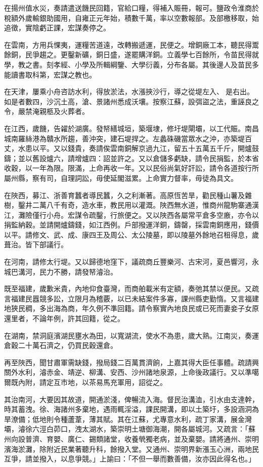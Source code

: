 \begin{pinyinscope}
在揚州值水災，奏請遣送饑民回籍，官給口糧，得補入賑冊，報可。鹽政令淮商於稅額外歲輸銀助國用，自雍正元年始，積數千萬，率以空數報部。及部檄移取，始追徵，實陰虧正課，宏謀奏停之。

在雲南，方用兵惈夷，運糧苦道遠，改轉搬遞運，民便之。增銅廠工本，聽民得鬻餘銅，民爭趨之。更鑿新礦，銅日盛，遂罷購洋銅。立義學七百餘所，令苗民得就學，教之書。刻孝經、小學及所輯綱鑒、大學衍義，分布各屬。其後邊人及苗民多能讀書取科第，宏謀之教也。

在天津，屢乘小舟咨訪水利，得放淤法，水漲挾沙行，導之從堤左入、是右出。如是者數四，沙沉土高，滄、景諸州悉成沃壤。按察江蘇，設弭盜之法，重誣良之令，嚴禁淹親柩及火葬者。

在江西，歲饑，告糴於湖廣。發帑繕城垣，築堰埭，修圩堤閘壩，以工代賑。南昌城南羅絲港為贛水所趨，善沖突，建石堤捍之。左蠡硃磯當眾水之沖，亦築堤百丈，水患以平。又以錢貴，奏請俟雲南銅解京過九江，留五十五萬五千斤，開爐鼓鑄；並以舊設爐六，請增爐四：詔並許之。又以倉儲多虧缺，請令民捐監，於本省收穀，以一年為限。限滿，上命再收一年。又以民俗尚氣好訐訟，請令各道按行所屬州縣，察有司，自理詞訟，毋使延閣滋累。上命實力督率，毋徒為具文。

在陜西，募江、浙善育蠶者導民蠶，久之利漸著。高原恆苦旱，勸民種山薯及雜樹，鑿井二萬八千有奇，造水車，教民用以灌溉。陜西無水道，惟商州龍駒寨通漢江，灘險僅行小舟。宏謀令疏鑿，行旅便之。又以陜西各屬常平倉多空廒，亦令以捐監納穀。並請開爐鑄錢，如江西例。戶部撥運洋銅，鑄罄，採雲南銅應用，錢價以平。請修文、武、成、康四王及周公、太公陵墓，即以陵墓外餘地召租得息，歲葺治。皆下部議行。

在河南，請修太行堤。又以歸德地窪下，議疏商丘豐樂河、古宋河，夏邑響河，永城巴溝河，民力不勝，請發帑濬治。

既至福建，歲歉米貴，內地仰食臺灣，而商舶載米有定額，奏弛其禁以便民。又疏言福建民囂競多訟，立限月為稽覈，以已未結案件多寡，課州縣吏勤惰。又言福建地狹民稠，多出海為商，年久例不準回籍。請令察實內地良民或已死而妻妾子女原還里者，不論年例，許其回籍，從之。

在湖南，禁洞庭濱湖民壅水為田，以寬湖流，使水不為患，歲大熟。江南災，奏運倉穀二十萬石濟之，仍買民穀還倉。

再至陜西，聞甘肅軍需缺錢，撥局錢二百萬貫濟餉，上嘉其得大臣任事體。疏請興關外水利，濬赤金、靖逆、柳溝、安西、沙州諸地泉源，上命後政議行。又以準噶爾既內附，請定互巿地，以茶易馬充軍用，詔從之。

其治南河，大要因其故道，開通淤淺，俾暢流入海。督民治溝洫，引水由支達幹，時其蓄洩。徐、海諸州多棄地，遇雨輒淫溢，課民開溝，即以土築圩，多設涵洞為旱潦備；低地則令種蘆葦，薄其賦。其在江蘇，尤專意水利，疏丁家溝，展金灣壩，濬徐六涇白茆口，洩太湖水，築崇明土塘御海潮，開各屬城河。又疏言：「蘇州向設普濟、育嬰、廣仁、錫類諸堂，收養煢獨老病，並及棄嬰。請將通州、崇明濱海淤灘，除附近民業著聽升科，餘撥入堂。又通州、崇明界新漲玉心洲，兩地民互爭，請並撥入，以息爭競。」上諭曰：「不但一舉而數善備，汝亦因此得名也。」


\end{pinyinscope}
